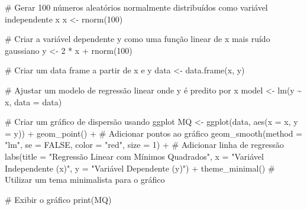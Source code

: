 \documentclass[
  a4paperpaper,
]{article}
\newenvironment{Shaded}{\begin{snugshade}}{\end{snugshade}}
\newcommand{\AttributeTok}[1]{\textcolor[rgb]{0.40,0.45,0.13}{#1}}
\newcommand{\CommentTok}[1]{\textcolor[rgb]{0.37,0.37,0.37}{#1}}
\newcommand{\ConstantTok}[1]{\textcolor[rgb]{0.56,0.35,0.01}{#1}}
\newcommand{\DecValTok}[1]{\textcolor[rgb]{0.68,0.00,0.00}{#1}}
\newcommand{\FunctionTok}[1]{\textcolor[rgb]{0.28,0.35,0.67}{#1}}
\newcommand{\NormalTok}[1]{\textcolor[rgb]{0.00,0.23,0.31}{#1}}
\newcommand{\OtherTok}[1]{\textcolor[rgb]{0.00,0.23,0.31}{#1}}
\newcommand{\SpecialCharTok}[1]{\textcolor[rgb]{0.37,0.37,0.37}{#1}}
\newcommand{\StringTok}[1]{\textcolor[rgb]{0.13,0.47,0.30}{#1}}
\begin{document}
\begin{Shaded}
\begin{Highlighting}[]
\CommentTok{\# Gerar 100 números aleatórios normalmente distribuídos como variável independente \textquotesingle{}x\textquotesingle{}}
\NormalTok{x }\OtherTok{\textless{}{-}} \FunctionTok{rnorm}\NormalTok{(}\DecValTok{100}\NormalTok{)}

\CommentTok{\# Criar a variável dependente \textquotesingle{}y\textquotesingle{} como uma função linear de \textquotesingle{}x\textquotesingle{} mais ruído gaussiano}
\NormalTok{y }\OtherTok{\textless{}{-}} \DecValTok{2} \SpecialCharTok{*}\NormalTok{ x }\SpecialCharTok{+} \FunctionTok{rnorm}\NormalTok{(}\DecValTok{100}\NormalTok{)}

\CommentTok{\# Criar um data frame a partir de x e y}
\NormalTok{data }\OtherTok{\textless{}{-}} \FunctionTok{data.frame}\NormalTok{(x, y)}

\CommentTok{\# Ajustar um modelo de regressão linear onde \textquotesingle{}y\textquotesingle{} é predito por \textquotesingle{}x\textquotesingle{}}
\NormalTok{model }\OtherTok{\textless{}{-}} \FunctionTok{lm}\NormalTok{(y }\SpecialCharTok{\textasciitilde{}}\NormalTok{ x, }\AttributeTok{data =}\NormalTok{ data)}

\CommentTok{\# Criar um gráfico de dispersão usando ggplot}
\NormalTok{MQ }\OtherTok{\textless{}{-}} \FunctionTok{ggplot}\NormalTok{(data, }\FunctionTok{aes}\NormalTok{(}\AttributeTok{x =}\NormalTok{ x, }\AttributeTok{y =}\NormalTok{ y)) }\SpecialCharTok{+}
  \FunctionTok{geom\_point}\NormalTok{() }\SpecialCharTok{+}  \CommentTok{\# Adicionar pontos ao gráfico}
  \FunctionTok{geom\_smooth}\NormalTok{(}\AttributeTok{method =} \StringTok{"lm"}\NormalTok{, }\AttributeTok{se =} \ConstantTok{FALSE}\NormalTok{, }\AttributeTok{color =} \StringTok{"red"}\NormalTok{, }\AttributeTok{size =} \DecValTok{1}\NormalTok{) }\SpecialCharTok{+}  \CommentTok{\# Adicionar linha de regressão}
  \FunctionTok{labs}\NormalTok{(}\AttributeTok{title =} \StringTok{"Regressão Linear com Mínimos Quadrados"}\NormalTok{, }\AttributeTok{x =} \StringTok{"Variável Independente (x)"}\NormalTok{, }\AttributeTok{y =} \StringTok{"Variável Dependente (y)"}\NormalTok{) }\SpecialCharTok{+}
  \FunctionTok{theme\_minimal}\NormalTok{()  }\CommentTok{\# Utilizar um tema minimalista para o gráfico}

\CommentTok{\# Exibir o gráfico}
\FunctionTok{print}\NormalTok{(MQ)}
\end{Highlighting}
\end{Shaded}
\end{document}
